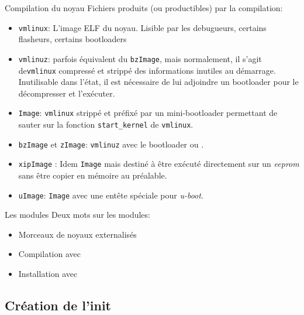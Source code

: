 \begin{frame}[fragile=singleslide]{Compilation du noyau}
  Fichiers produits (ou productibles) par la compilation:
  \begin{itemize}
  \item  \verb+vmlinux+:  L'image  ELF  du  noyau.   Lisible  par  les
    debugueurs, certains flasheurs, certains bootloaders
  \item  \verb+vmlinuz+: parfois  équivalent  du \verb+bzImage+,  mais
    normalement, il  s'agit de\verb+vmlinux+ compressé  et strippé des
    informations inutiles  au démarrage. Inutilisable  dans l'état, il
    est nécessaire de lui adjoindre un bootloader pour le décompresser
    et l'exécuter.
  \item  \verb+Image+:  \verb+vmlinux+   strippé  et  préfixé  par  un
    mini-bootloader   permettant    de   sauter   sur    la   fonction
    \verb+start_kernel+ de \verb+vmlinux+.
  \item  \verb+bzImage+  et   \verb+zImage+:  \verb+vmlinuz+  avec  le
    bootloader  ou .
  \item  \verb+xipImage+  :  Idem  \verb+Image+ mais  destiné  à  être
    exécuté  directement  sur un  \emph{eeprom}  sans  être copier  en
    mémoire au préalable.
  \item  \verb+uImage+:  \verb+Image+ avec  une  entête spéciale  pour
    \emph{u-boot}.
  \end{itemize}
\end{frame}

\begin{frame}[fragile=singleslide]{Les modules}
Deux mots sur les modules:
  \begin{itemize}
  \item Morceaux de noyaux externalisés
  \item Compilation avec 
  \item Installation avec 
  \end{itemize}
\end{frame}

\subsection{Création de l'init}

